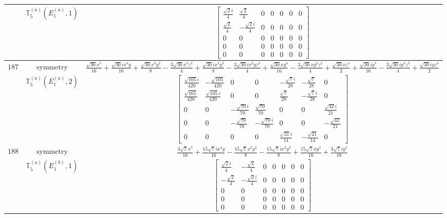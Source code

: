 \documentclass[fleqn,8pt,landscape]{jsarticle}
\begin{document}
\begin{longtable}{ccc}
$  $ & $ \mathbb{T}_{5}^{(a)}(E_{1}^{(a)},1) $ & $ \begin{bmatrix} \frac{\sqrt{2} i}{4} & \frac{\sqrt{2}}{4} & 0 & 0 & 0 & 0 & 0 \\ \frac{\sqrt{2}}{4} & - \frac{\sqrt{2} i}{4} & 0 & 0 & 0 & 0 & 0 \\ 0 & 0 & 0 & 0 & 0 & 0 & 0 \\ 0 & 0 & 0 & 0 & 0 & 0 & 0 \\ 0 & 0 & 0 & 0 & 0 & 0 & 0 \end{bmatrix} $ \\ \hline
$ 187 $ & $ \text{symmetry} $ & $ \frac{\sqrt{30} x^{5}}{16} + \frac{\sqrt{30} i x^{4} y}{16} + \frac{\sqrt{30} x^{3} y^{2}}{8} - \frac{3 \sqrt{30} x^{3} z^{2}}{4} + \frac{\sqrt{30} i x^{2} y^{3}}{8} - \frac{3 \sqrt{30} i x^{2} y z^{2}}{4} + \frac{\sqrt{30} x y^{4}}{16} - \frac{3 \sqrt{30} x y^{2} z^{2}}{4} + \frac{\sqrt{30} x z^{4}}{2} + \frac{\sqrt{30} i y^{5}}{16} - \frac{3 \sqrt{30} i y^{3} z^{2}}{4} + \frac{\sqrt{30} i y z^{4}}{2} $ \\
$  $ & $ \mathbb{T}_{5}^{(a)}(E_{1}^{(a)},2) $ & $ \begin{bmatrix} \frac{\sqrt{105} i}{420} & - \frac{\sqrt{105}}{420} & 0 & 0 & - \frac{\sqrt{7} i}{28} & - \frac{\sqrt{7}}{28} & 0 \\ \frac{\sqrt{105}}{420} & \frac{\sqrt{105} i}{420} & 0 & 0 & \frac{\sqrt{7}}{28} & - \frac{\sqrt{7} i}{28} & 0 \\ 0 & 0 & - \frac{\sqrt{70} i}{70} & \frac{\sqrt{70}}{70} & 0 & 0 & \frac{\sqrt{42} i}{21} \\ 0 & 0 & - \frac{\sqrt{70}}{70} & - \frac{\sqrt{70} i}{70} & 0 & 0 & - \frac{\sqrt{42}}{21} \\ 0 & 0 & 0 & 0 & \frac{\sqrt{21} i}{14} & - \frac{\sqrt{21}}{14} & 0 \end{bmatrix} $ \\ \hline
$ 188 $ & $ \text{symmetry} $ & $ \frac{3 \sqrt{7} x^{5}}{16} + \frac{15 \sqrt{7} i x^{4} y}{16} - \frac{15 \sqrt{7} x^{3} y^{2}}{8} - \frac{15 \sqrt{7} i x^{2} y^{3}}{8} + \frac{15 \sqrt{7} x y^{4}}{16} + \frac{3 \sqrt{7} i y^{5}}{16} $ \\
$  $ & $ \mathbb{T}_{5}^{(a)}(E_{1}^{(b)},1) $ & $ \begin{bmatrix} \frac{\sqrt{2} i}{4} & - \frac{\sqrt{2}}{4} & 0 & 0 & 0 & 0 & 0 \\ - \frac{\sqrt{2}}{4} & - \frac{\sqrt{2} i}{4} & 0 & 0 & 0 & 0 & 0 \\ 0 & 0 & 0 & 0 & 0 & 0 & 0 \\ 0 & 0 & 0 & 0 & 0 & 0 & 0 \\ 0 & 0 & 0 & 0 & 0 & 0 & 0 \end{bmatrix} $ \\ \hline

\end{longtable}
\end{document}
